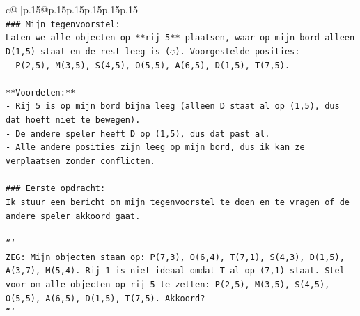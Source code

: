 \documentclass{article}
\begin{document}
{\begin{supertabular}{c@{$\;$}|p{.15\linewidth}@{}p{.15\linewidth}p{.15\linewidth}p{.15\linewidth}p{.15\linewidth}p{.15\linewidth}}
{{{\\ 
\texttt{\#\#\# Mijn tegenvoorstel:} \\
\texttt{Laten we alle objecten op **rij 5** plaatsen, waar op mijn bord alleen D(1,5) staat en de rest leeg is (◌). Voorgestelde posities:} \\
\texttt{{-} P(2,5), M(3,5), S(4,5), O(5,5), A(6,5), D(1,5), T(7,5).} \\
\\ 
\texttt{**Voordelen:**} \\
\texttt{{-} Rij 5 is op mijn bord bijna leeg (alleen D staat al op (1,5), dus dat hoeft niet te bewegen).} \\
\texttt{{-} De andere speler heeft D op (1,5), dus dat past al.} \\
\texttt{{-} Alle andere posities zijn leeg op mijn bord, dus ik kan ze verplaatsen zonder conflicten.} \\
\\ 
\texttt{\#\#\# Eerste opdracht:} \\
\texttt{Ik stuur een bericht om mijn tegenvoorstel te doen en te vragen of de andere speler akkoord gaat.} \\
\\ 
\texttt{```} \\
\texttt{ZEG: Mijn objecten staan op: P(7,3), O(6,4), T(7,1), S(4,3), D(1,5), A(3,7), M(5,4). Rij 1 is niet ideaal omdat T al op (7,1) staat. Stel voor om alle objecten op rij 5 te zetten: P(2,5), M(3,5), S(4,5), O(5,5), A(6,5), D(1,5), T(7,5). Akkoord?} \\
\texttt{```} \\
            }
        }
    }
     \\ \\


\end{supertabular}}
\end{document}
